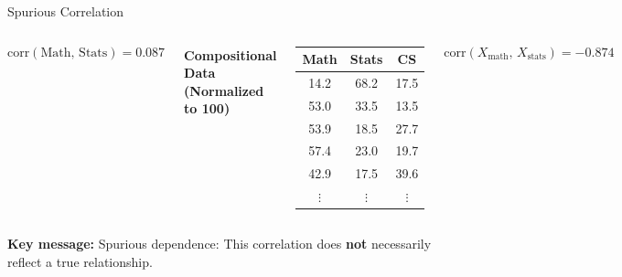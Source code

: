 \begin{frame}{Spurious Correlation}
{\begin{columns}
    \vspace{0.2cm}
    \[
      \mathrm{corr}(\text{Math},\,\text{Stats}) = 0.087
    \]

    \textbf{Compositional Data (Normalized to 100)}

    \vspace{0.2cm}
    \begin{center}
    \begin{tabular}{ccc}
      \hline
      Math & Stats & CS \\
      \hline
      14.2 & 68.2 & 17.5 \\
      53.0 & 33.5 & 13.5 \\
      53.9 & 18.5 & 27.7 \\
      57.4 & 23.0 & 19.7 \\
      42.9 & 17.5 & 39.6 \\
      $\vdots$ & $\vdots$ & $\vdots$ \\
      \hline
    \end{tabular}
    \end{center}

    \vspace{0.2cm}
    \[
      \mathrm{corr}(X_{\text{math}},\, X_{\text{stats}}) = -0.874
    \]
  \end{columns}

  \vspace{0.3em}
  \textbf{Key message:} Spurious dependence:
  This correlation does \textbf{not} necessarily reflect a true relationship.
}

\end{frame}


